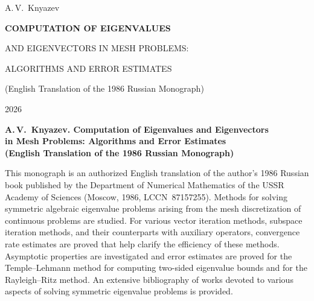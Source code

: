 \documentclass[11pt,oneside]{book}
\begin{document}
\begin{titlepage}
\thispagestyle{empty}
\centering
\vspace*{10mm}

\vspace{45mm}
{\Large A.\,V.~Knyazev\par}

\vspace{12mm}
{\LARGE\bfseries COMPUTATION OF EIGENVALUES\par\smallskip
AND EIGENVECTORS IN MESH PROBLEMS:\par\smallskip
ALGORITHMS AND ERROR ESTIMATES\par}

\vspace{6mm}
{\large (English Translation of the 1986 Russian Monograph)\par}

\vfill
{\large 2026\par}
\vspace{10mm}
\end{titlepage}

\thispagestyle{empty}
\vspace*{8mm}
{\centering\bfseries A.\,V.~Knyazev. Computation of Eigenvalues and Eigenvectors\\
in Mesh Problems: Algorithms and Error Estimates\\
{\mdseries (English Translation of the 1986 Russian Monograph)}\par}
\vspace{8mm}

This monograph is an authorized English translation of the author's 1986 Russian book published by the Department of Numerical Mathematics of the USSR Academy of Sciences (Moscow, 1986, LCCN~87157255). Methods for solving symmetric algebraic eigenvalue problems arising from the mesh discretization of continuous problems are studied. For various vector iteration methods, subspace iteration methods, and their counterparts with auxiliary operators, convergence rate estimates are proved that help clarify the efficiency of these methods. Asymptotic properties are investigated and error estimates are proved for the Temple--Lehmann method for computing two-sided eigenvalue bounds and for the Rayleigh--Ritz method. An extensive bibliography of works devoted to various aspects of solving symmetric eigenvalue problems is provided.
\end{document}
